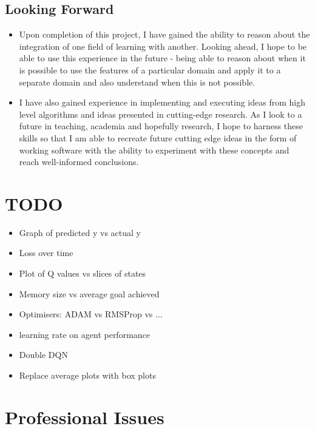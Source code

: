 \documentclass{article}
\begin{document}
\subsection{Looking Forward}

\begin{itemize}
    \item Upon completion of this project, I have gained the ability to reason about the integration of one field of learning with another. Looking ahead, I hope to be able to use this experience in the future - being able to reason about when it is possible to use the features of a particular domain and apply it to a separate domain and also understand when this is not possible.
    
    \item I have also gained experience in implementing and executing ideas from high level algorithms and ideas presented in cutting-edge research. As I look to a future in teaching, academia and hopefully research, I hope to harness these skills so that I am able to recreate future cutting edge ideas in the form of working software with the ability to experiment with these concepts and reach well-informed conclusions.
\end{itemize}


\newpage

\section{TODO}

\begin{itemize}
    \item Graph of predicted y vs actual y 
    \item Loss over time 
    \item Plot of Q values vs slices of states
    \item Memory size vs average goal achieved
    \item Optimisers: ADAM vs RMSProp vs ... 
    \item learning rate on agent performance
    \item Double DQN
    \item Replace average plots with box plots
\end{itemize}






\newpage
\section{Professional Issues}
\end{document}
